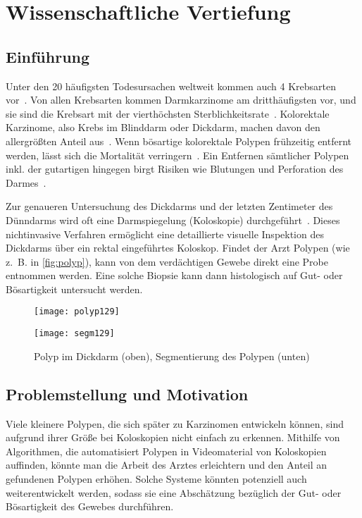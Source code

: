\chapter{Wissenschaftliche Vertiefung}

\section{Einführung}

Unter den 20 häufigsten Todesursachen weltweit kommen auch 4 Krebsarten vor~\cite{Lozano.2012}.
Von allen Krebsarten kommen Darmkarzinome am dritthäufigsten vor, und sie sind die Krebsart mit der vierthöchsten Sterblichkeitsrate~\cite{Ferlay.2012}.
Kolorektale Karzinome, also Krebs im Blinddarm oder Dickdarm, machen davon den allergrößten Anteil aus~\cite{Kumar.2005}.
Wenn bösartige kolorektale Polypen frühzeitig entfernt werden, lässt sich die Mortalität verringern~\cite{Zauber.2012}.
Ein Entfernen sämtlicher Polypen inkl. der gutartigen hingegen birgt Risiken wie Blutungen und Perforation des Darmes~\cite{Rex.2009}.

Zur genaueren Untersuchung des Dickdarms und der letzten Zentimeter des Dünndarms wird oft eine Darmspiegelung (Koloskopie) durchgeführt~\cite{Schachschal.2010}.
Dieses nichtinvasive Verfahren ermöglicht eine detaillierte visuelle Inspektion des Dickdarms über ein rektal eingeführtes Koloskop.
Findet der Arzt Polypen (wie z.~B. in \autoref{fig:polyp}), kann von dem verdächtigen Gewebe direkt eine Probe entnommen werden.
Eine solche Biopsie kann dann histologisch auf Gut- oder Bösartigkeit untersucht werden.

\begin{figure}[h]
	\centering
	\texttt{[image: polyp129]}

	\vspace{\baselineskip}

	\texttt{[image: segm129]}
	\caption{Polyp im Dickdarm (oben), Segmentierung des Polypen (unten)}
	\label{fig:polyp}
\end{figure}



\section{Problemstellung und Motivation}

Viele kleinere Polypen, die sich später zu Karzinomen entwickeln können, sind aufgrund ihrer Größe bei Koloskopien nicht einfach zu erkennen.
Mithilfe von Algorithmen, die automatisiert Polypen in Videomaterial von Koloskopien auffinden, könnte man die Arbeit des Arztes erleichtern und den Anteil an gefundenen Polypen erhöhen.
Solche Systeme könnten potenziell auch weiterentwickelt werden, sodass sie eine Abschätzung bezüglich der Gut- oder Bösartigkeit des Gewebes durchführen.

